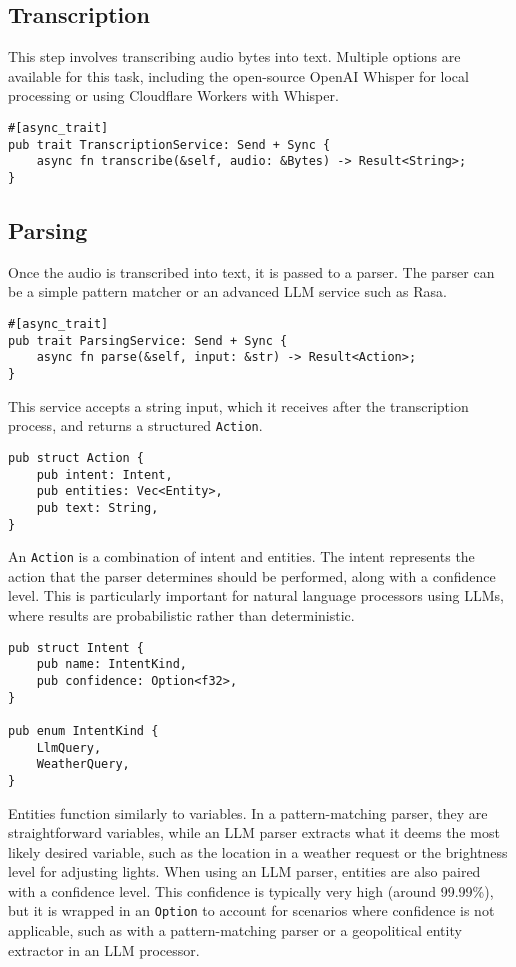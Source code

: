 \subsection{Transcription}
This step involves transcribing audio bytes into text. Multiple options are available for this task,
including the open-source OpenAI Whisper for local processing or using Cloudflare Workers with Whisper.

\begin{verbatim}
#[async_trait]
pub trait TranscriptionService: Send + Sync {
    async fn transcribe(&self, audio: &Bytes) -> Result<String>;
}
\end{verbatim}

\subsection{Parsing}
Once the audio is transcribed into text, it is passed to a parser.
The parser can be a simple pattern matcher or an advanced LLM service such as Rasa.

\begin{verbatim}
#[async_trait]
pub trait ParsingService: Send + Sync {
    async fn parse(&self, input: &str) -> Result<Action>;
}
\end{verbatim}

This service accepts a string input, which it receives after the transcription process, and returns a structured \texttt{Action}.

\begin{verbatim}
pub struct Action {
    pub intent: Intent,
    pub entities: Vec<Entity>,
    pub text: String,
}
\end{verbatim}

An \texttt{Action} is a combination of intent and entities.
The intent represents the action that the parser determines should be performed, along with a confidence level.
This is particularly important for natural language processors using LLMs, where results are probabilistic rather than deterministic.

\begin{verbatim}
pub struct Intent {
    pub name: IntentKind,
    pub confidence: Option<f32>,
}

pub enum IntentKind {
    LlmQuery,
    WeatherQuery,
}
\end{verbatim}

Entities function similarly to variables. In a pattern-matching parser, they are straightforward variables,
while an LLM parser extracts what it deems the most likely desired variable,
such as the location in a weather request or the brightness level for adjusting lights.
When using an LLM parser, entities are also paired with a confidence level.
This confidence is typically very high (around 99.99\%), but it is wrapped in an \texttt{Option}
to account for scenarios where confidence is not applicable,
such as with a pattern-matching parser or a geopolitical entity extractor in an LLM processor.

